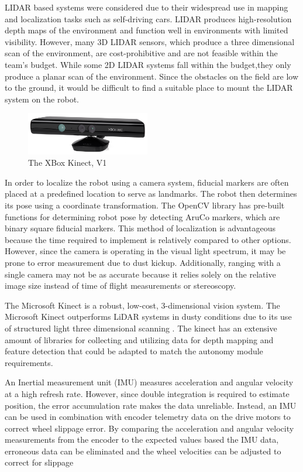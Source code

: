 \documentclass[class=article, crop=false]{standalone}
\begin{document}
	LIDAR based systems were considered due to their widespread use in mapping and localization tasks such as self-driving cars. LIDAR produces high-resolution depth maps of the environment and function  well in environments with limited visibility. However, many 3D LIDAR sensors, which produce a three dimensional scan of the environment, are cost-prohibitive and are not feasible within the team’s budget. While some 2D LIDAR systems fall within the budget,they only produce a planar scan of the environment. Since the obstacles on the field are low to the ground, it would be difficult to find a suitable place to mount the LIDAR system on the robot. 
	
	\begin{figure}
	\centering
	 \includegraphics[width=0.48\textwidth]{09_Figures/xbox-360-kinect.png}
	 \caption{The XBox Kinect, V1}
	 \label{fig:kinect-pic}
	\end{figure}
	
	In order to localize the robot using a camera system, fiducial markers are often placed at a predefined location to serve as landmarks. The robot then determines its pose using a coordinate transformation. The OpenCV library has pre-built functions for determining robot pose by detecting AruCo markers, which are binary square fiducial markers. This method of localization is advantageous because the time required to implement is relatively compared to other options. However, since the camera is operating in the visual light spectrum, it may be prone to error measurement due to dust kickup. Additionally, ranging with a single camera may not be as accurate because it relies solely on the relative image size instead of time of flight measurements or stereoscopy.
	
	The Microsoft Kinect is a robust, low-cost, 3-dimensional vision system. The Microsoft Kinect outperforms LiDAR systems in dusty conditions due to its use of structured light three dimensional scanning \cite{kinect}. The kinect has an extensive amount of libraries for collecting and utilizing data for depth mapping and feature detection that could be adapted to match the autonomy module requirements. 
	
	An Inertial measurement unit (IMU) measures acceleration and angular velocity at a high refresh rate. However, since double integration is required to estimate position, the error accumulation rate makes the data unreliable. Instead, an IMU can be used in combination with encoder telemetry data on the drive motors to correct wheel slippage error. By comparing the acceleration and angular velocity measurements from the encoder to the expected values based the IMU data, erroneous data can be eliminated and the wheel velocities can be adjusted to correct for slippage
	
\end{document}

